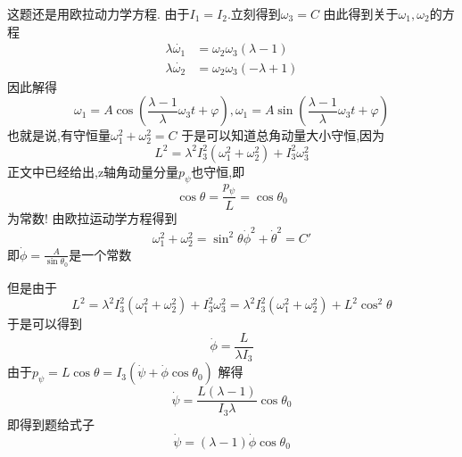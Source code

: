 \begin{solution}
    这题还是用欧拉动力学方程.
    由于$I_1=I_2$.立刻得到$\omega_3=C$
    由此得到关于$\omega_1,\omega_2$的方程
    \begin{align*}
        \lambda\dot{\omega_1}&=\omega_2\omega_3(\lambda-1)\\
        \lambda\dot{\omega_2}&=\omega_2\omega_3(-\lambda+1)
    \end{align*}
    因此解得
    $$\omega_1=A\cos(\frac{\lambda-1}{\lambda}\omega_3 t+\varphi),\omega_1=A\sin(\frac{\lambda-1}{\lambda}\omega_3 t+\varphi)$$
    也就是说,有守恒量$\omega_1^2+\omega_2^2=C$
    于是可以知道总角动量大小守恒,因为
    $$L^2=\lambda^2 I_3^2(\omega_1^2+\omega_2^2)+I_3^2\omega_3^2$$
    正文中已经给出,z轴角动量分量$p_\psi$也守恒,即
    $$\cos\theta=\frac{p_\psi}{L}=\cos\theta_0$$
    为常数!
    由欧拉运动学方程得到
    $$\omega_1^2+\omega_2^2=\sin^2\theta\dot\phi^2+\dot\theta^2=C'$$
    即$\dot\phi=\frac{A}{\sin\theta_0}$是一个常数
    
    但是由于$$L^2=\lambda^2I_3^2(\omega_1^2+\omega_2^2)+I_3^2\omega_3^2=\lambda^2 I_3^2(\omega_1^2+\omega_2^2)+L^2\cos^2\theta$$
    于是可以得到
    $$\dot\phi=\frac{L}{\lambda I_3}$$
    由于$p_\psi=L\cos\theta=I_3(\dot\psi+\dot\phi\cos\theta_0)$
    解得
    $$\dot\psi=\frac{L(\lambda-1)}{I_3\lambda}\cos\theta_0$$
    即得到题给式子
    $$\dot\psi=(\lambda-1)\dot\phi\cos\theta_0$$
\end{solution}